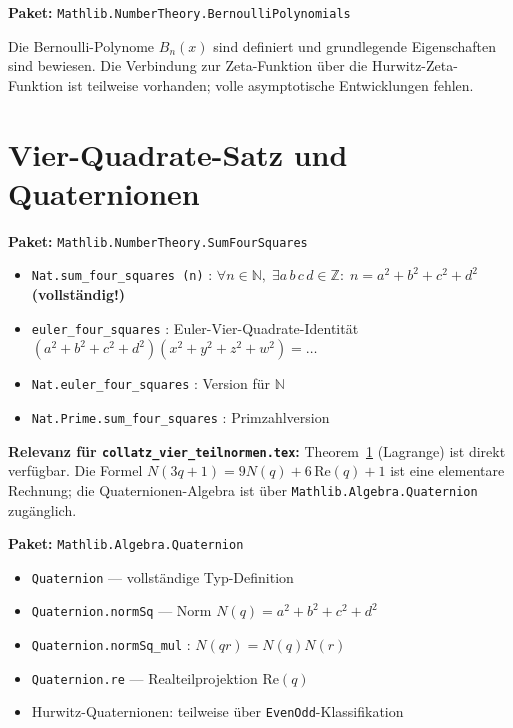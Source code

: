 \documentclass[12pt,a4paper]{article}
\newcommand{\N}{\mathbb{N}}
\newcommand{\Z}{\mathbb{Z}}
\newcommand{\Mathlib}[1]{\texttt{Mathlib.\allowbreak #1}}
\begin{document}
\begin{tcolorbox}[teilweise, title={Teilweise vorhanden: Bernoulli-Polynome}]
\textbf{Paket:} \Mathlib{NumberTheory.BernoulliPolynomials}

Die Bernoulli-Polynome $B_n(x)$ sind definiert und grundlegende Eigenschaften
sind bewiesen. Die Verbindung zur Zeta-Funktion über die Hurwitz-Zeta-Funktion
ist teilweise vorhanden; volle asymptotische Entwicklungen fehlen.
\end{tcolorbox}

\section{Vier-Quadrate-Satz und Quaternionen}
\label{sec:vierquadrate}

\begin{tcolorbox}[vorhanden, title={Formalisiert: Lagrange-Vierquadratesatz}]
\textbf{Paket:} \Mathlib{NumberTheory.SumFourSquares}

\begin{itemize}[nosep]
  \item \texttt{Nat.sum\_four\_squares (n)} :
    $\forall n \in \N,\; \exists a\,b\,c\,d \in \Z:\; n = a^2+b^2+c^2+d^2$
    \quad \textbf{(vollständig!)}
  \item \texttt{euler\_four\_squares} : Euler-Vier-Quadrate-Identität
    $(a^2+b^2+c^2+d^2)(x^2+y^2+z^2+w^2) = \ldots$
  \item \texttt{Nat.euler\_four\_squares} : Version für $\N$
  \item \texttt{Nat.Prime.sum\_four\_squares} : Primzahlversion
\end{itemize}

\textbf{Relevanz für \texttt{collatz\_vier\_teilnormen.tex}:}
Theorem~\ref{sec:vierquadrate} (Lagrange) ist direkt verfügbar.
Die Formel $N(3q+1) = 9N(q)+6\,\mathrm{Re}(q)+1$ ist eine elementare
Rechnung; die Quaternionen-Algebra ist über \texttt{Mathlib.Algebra.Quaternion}
zugänglich.
\end{tcolorbox}

\begin{tcolorbox}[vorhanden, title={Formalisiert: Quaternionen-Algebra}]
\textbf{Paket:} \Mathlib{Algebra.Quaternion}

\begin{itemize}[nosep]
  \item \texttt{Quaternion} --- vollständige Typ-Definition
  \item \texttt{Quaternion.normSq} --- Norm $N(q) = a^2+b^2+c^2+d^2$
  \item \texttt{Quaternion.normSq\_mul} : $N(qr) = N(q)N(r)$
  \item \texttt{Quaternion.re} --- Realteilprojektion $\mathrm{Re}(q)$
  \item Hurwitz-Quaternionen: teilweise über \texttt{EvenOdd}-Klassifikation
\end{itemize}
\end{tcolorbox}
\end{document}
